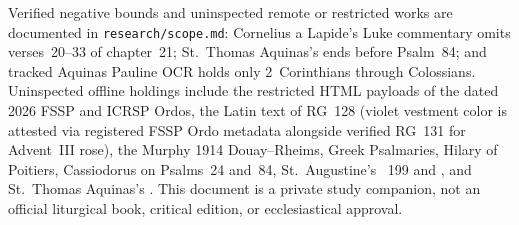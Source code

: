 Verified negative bounds and uninspected remote or restricted works are documented in \texttt{research/scope.md}: Cornelius a Lapide's Luke commentary omits verses~20--33 of chapter~21; St.~Thomas Aquinas's  ends before Psalm~84; and tracked Aquinas Pauline OCR holds only 2~Corinthians through Colossians. Uninspected offline holdings include the restricted HTML payloads of the dated 2026 FSSP and ICRSP Ordos, the Latin text of RG~128 (violet vestment color is attested via registered FSSP Ordo metadata alongside verified RG~131 for Advent~III rose), the Murphy 1914 Douay--Rheims, Greek Psalmaries, Hilary of Poitiers, Cassiodorus on Psalms~24 and~84, St.~Augustine's ~199 and , and St.~Thomas Aquinas's . This document is a private study companion, not an official liturgical book, critical edition, or ecclesiastical approval.
